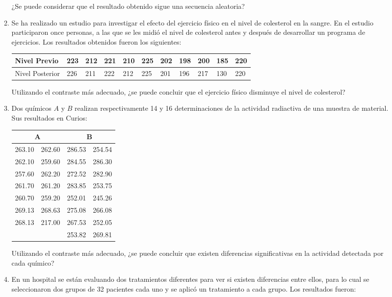 \begin{description}
\begin{enumerate}[leftmargin=*]
\begin{enumerate}
¿Se puede considerar que el resultado obtenido sigue una secuencia aleatoria?


\item  Se ha realizado un estudio para investigar el efecto del
ejercicio físico en el nivel de colesterol en la sangre. En el
estudio participaron once personas, a las que se les midió el
nivel de colesterol antes y después de desarrollar un programa
de ejercicios. Los resultados obtenidos fueron los siguientes:
\begin{center}
\begin{tabular}{|l|l|l|l|l|l|l|l|l|l|l|}
\hline
Nivel Previo & 223 & 212 & 221 & 210 & 225 & 202 & 198 & 200 & 185 & 220\\
\hline
Nivel Posterior & 226 & 211 & 222 & 212 & 225 & 201 & 196 & 217 & 130 &220  \\
\hline
\end{tabular}
\end{center}

Utilizando el contraste más adecuado, ¿se puede concluir que el ejercicio
físico disminuye el nivel de colesterol?


\item Dos químicos $A$ y $B$ realizan respectivamente 14 y 16 determinaciones de la actividad radiactiva de una muestra de material. Sus resultados en Curios:
\begin{center}
\begin{tabular}{ll|ll}
\multicolumn{2}{c|}{A} & \multicolumn{2}{c}{B} \\
\hline
263.10 & 262.60 & 286.53 & 254.54 \\
262.10 & 259.60 & 284.55 & 286.30 \\
257.60 & 262.20 & 272.52 & 282.90 \\
261.70 & 261.20 & 283.85 & 253.75 \\
260.70 & 259.20 & 252.01 & 245.26 \\
269.13 & 268.63 & 275.08 & 266.08 \\
268.13 & 217.00 & 267.53 & 252.05 \\
 &  & 253.82 & 269.81 \\
\end{tabular}
\end{center}

Utilizando el contraste más adecuado, ¿se puede concluir que existen diferencias significativas en la actividad detectada por cada químico?


\item En un hospital se están evaluando dos tratamientos diferentes para ver si existen diferencias entre ellos, para lo cual se seleccionaron dos grupos de 32 pacientes cada uno y se aplicó un tratamiento a cada grupo. Los resultados fueron:


\end{enumerate}
\end{enumerate}
\end{description}
